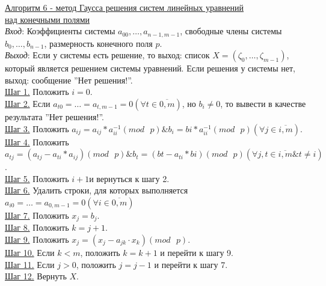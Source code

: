 \documentclass[bachelor, och, labwork]{SCWorks}
\begin{document}
        \underline{Алгоритм 6 - метод Гаусса решения систем линейных уравнений}\\
        \underline{над конечными полями}\\
            \textit{Вход}: Коэффициенты системы
            $a_{00}, \dots, a_{n-1,m-1}$, свободные члены системы $b_0, \dots,
            b_{n-1}$, размерность конечного поля $p$.\\
            \textit{Выход}: Если у системы есть решение, то выход: список $X =
            (\zeta_0, \dots, \zeta_{m - 1})$, который является решением системы
            уравнений. Если решения у системы нет, выход: сообщение ''Нет решения!''.\\
            \underline{Шаг 1.} Положить $i = 0$.\\
            \underline{Шаг 2.} Если $a_{t0} = \dots = a_{t,m-1} = 0 (\forall t \in \overline{0,m})$,
            но $b_i \neq 0$, то вывести в качестве результата ''Нет решения!''.\\
            \underline{Шаг 3.} Положить $a_{ij} = a_{ij} * a_{ii}^{-1} (mod \text{ } p) \& b_{i}=b{i} * a_{ii}^{-1} (mod \text{ } p) (\forall j \in \overline{i,m})$.\\
            \underline{Шаг 4.} Положить $a_{tj} = (a_{tj} - a_{ti} * a_{ij}) (mod \text{ } p) \& b_{t} = 
            (b{t} - a_{ti} * b{i}) (mod \text{ } p) (\forall j, t \in \overline{i,m} \& t \neq i)$.\\
            \underline{Шаг 5.} Положить $i+1$и вернуться к шагу 2.\\
            \underline{Шаг 6.} Удалить строки, для которых выполняется $a_{i0} = \dots = a_{0,m-1} = 0 (\forall i \in \overline{0,m})$ \\
            \underline{Шаг 7.} Положить $x_j = b_j$.\\
            \underline{Шаг 8.} Положить $k = j + 1$.\\
            \underline{Шаг 9.} Положить $x_j = (x_j - a_{jk} \cdot x_k) (mod
            \text{ } p)$.\\
            \underline{Шаг 10.} Если $k < m$, положить $k = k + 1$ и перейти к
            шагу 9.\\
            \underline{Шаг 11.} Если $j > 0$, положить $j = j - 1$ и перейти к
            шагу 7.\\
            \underline{Шаг 12.} Вернуть $X$.
\end{document}
